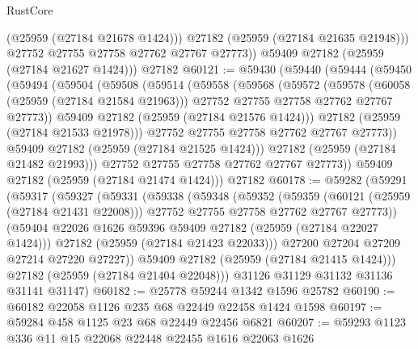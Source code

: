 \begin{lexlean}{RustCore}
\begin{coremodule}
              (@25959 (@27184 @21678 @1424)))
            @27182
            (@25959 (@27184 @21635 @21948)))
          @27752
          @27755
          @27758
          @27762
          @27767
          @27773))
      @59409
      @27182
      (@25959 (@27184 @21627 @1424)))
    @27182
@60121 := @59430
    (@59440
      (@59444
        (@59450
          (@59494
            (@59504
              (@59508
                (@59514
                  (@59558
                    (@59568
                      (@59572
                        (@59578
                          (@60058 (@25959 (@27184 @21584 @21963)))
                          @27752
                          @27755
                          @27758
                          @27762
                          @27767
                          @27773))
                      @59409
                      @27182
                      (@25959 (@27184 @21576 @1424)))
                    @27182
                    (@25959 (@27184 @21533 @21978)))
                  @27752
                  @27755
                  @27758
                  @27762
                  @27767
                  @27773))
              @59409
              @27182
              (@25959 (@27184 @21525 @1424)))
            @27182
            (@25959 (@27184 @21482 @21993)))
          @27752
          @27755
          @27758
          @27762
          @27767
          @27773))
      @59409
      @27182
      (@25959 (@27184 @21474 @1424)))
    @27182
@60178 := @59282
    (@59291
      (@59317
        (@59327
          (@59331
            (@59338
              (@59348
                (@59352
                  (@59359
                    (@60121 (@25959 (@27184 @21431 @22008)))
                    @27752
                    @27755
                    @27758
                    @27762
                    @27767
                    @27773))
                (@59404 @22026 @1626 @59396 @59409 @27182 (@25959 (@27184 @22027 @1424)))
                @27182
                (@25959 (@27184 @21423 @22033)))
              @27200
              @27204
              @27209
              @27214
              @27220
              @27227))
          @59409
          @27182
          (@25959 (@27184 @21415 @1424)))
        @27182
        (@25959 (@27184 @21404 @22048)))
      @31126
      @31129
      @31132
      @31136
      @31141
      @31147)
@60182 := @25778 @59244 @1342 @1596 @25782
@60190 := @60182 @22058 @1126 @235 @68 @22449 @22458 @1424 @1598
@60197 := @59284 @458 @1125 @23 @68 @22449 @22456 @6821
@60207 := @59293 @1123 @336 @11 @15 @22068 @22448 @22455 @1616 @22063 @1626

\end{coremodule}
\end{lexlean}
